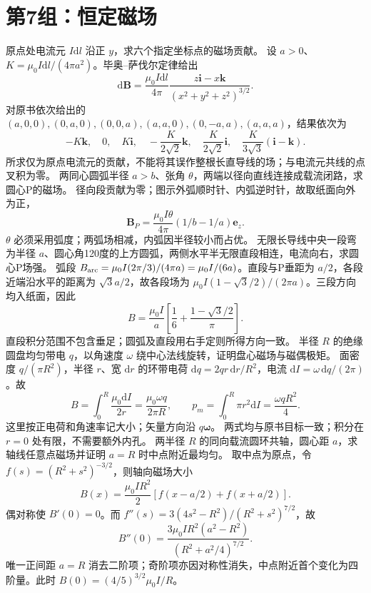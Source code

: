 \section{第7组：恒定磁场}
\problemtext 原点处电流元 $I\mathrm dl$ 沿正 $y$，求六个指定坐标点的磁场贡献。
\workings 设 $a>0$、$K=\mu_0 I\mathrm dl/(4\pi a^2)$。毕奥--萨伐尔定律给出
\[
\mathrm d\bm B=\frac{\mu_0 I\mathrm dl}{4\pi}\frac{z\bm i-x\bm k}{(x^2+y^2+z^2)^{3/2}}.
\]
对原书依次给出的 $(a,0,0),(0,a,0),(0,0,a),(a,a,0),(0,-a,a),(a,a,a)$，结果依次为
\[
-K\bm k,\quad 0,\quad K\bm i,\quad
-\frac{K}{2\sqrt2}\bm k,\quad
\frac{K}{2\sqrt2}\bm i,\quad
\frac{K}{3\sqrt3}(\bm i-\bm k).
\]
\crosscheck 所求仅为原点电流元的贡献，不能将其误作整根长直导线的场；与电流元共线的点叉积为零。
\problemtext 两同心圆弧半径 $a>b$、张角 $\theta$，两端以径向直线连接成载流闭路，求圆心P的磁场。
\workings 径向段贡献为零；图示外弧顺时针、内弧逆时针，故取纸面向外为正，
\[
\bm B_P=\frac{\mu_0I\theta}{4\pi}(1/b-1/a)\bm e_z.
\]
\crosscheck $\theta$ 必须采用弧度；两弧场相减，内弧因半径较小而占优。
\problemtext 无限长导线中央一段弯为半径 $a$、圆心角120度的上方圆弧，两侧水平半无限直段相连，电流向右，求圆心P场强。
\workings 弧段 $B_{\rm arc}=\mu_0 I(2\pi/3)/(4\pi a)=\mu_0 I/(6a)$。直段与P垂距为 $a/2$，各段近端沿水平的距离为 $\sqrt3a/2$，故各段场为 $\mu_0 I(1-\sqrt3/2)/(2\pi a)$。三段方向均入纸面，因此
\[
B=\frac{\mu_0 I}{a}\left[\frac16+\frac{1-\sqrt3/2}{\pi}\right].
\]
\crosscheck 直段积分范围不包含垂足；圆弧及直段用右手定则所得方向一致。
\problemtext 半径 $R$ 的绝缘圆盘均匀带电 $q$，以角速度 $\omega$ 绕中心法线旋转，证明盘心磁场与磁偶极矩。
\workings 面密度 $q/(\pi R^2)$，半径 $r$、宽 $\mathrm dr$ 的环带电荷 $\mathrm dq=2qr\,\mathrm dr/R^2$，电流 $\mathrm dI=\omega\,\mathrm dq/(2\pi)$。故
\[
B=\int_0^R \frac{\mu_0\mathrm dI}{2r}=\frac{\mu_0\omega q}{2\pi R},\qquad
p_m=\int_0^R\pi r^2\mathrm dI=\frac{\omega qR^2}{4}.
\]
这里按正电荷和角速率记大小；矢量方向沿 $q\bm\omega$。
\crosscheck 两式均与原书目标一致；积分在 $r=0$ 处有限，不需要额外内孔。
\problemtext 两半径 $R$ 的同向载流圆环共轴，圆心距 $a$，求轴线任意点磁场并证明 $a=R$ 时中点附近最均匀。
\workings 取中点为原点，令 $f(s)=(R^2+s^2)^{-3/2}$，则轴向磁场大小
\[
B(x)=\frac{\mu_0IR^2}{2}[f(x-a/2)+f(x+a/2)].
\]
偶对称使 $B'(0)=0$。而 $f''(s)=3(4s^2-R^2)/(R^2+s^2)^{7/2}$，故
\[
B''(0)=\frac{3\mu_0IR^2(a^2-R^2)}{(R^2+a^2/4)^{7/2}}.
\]
唯一正间距 $a=R$ 消去二阶项；奇阶项亦因对称性消失，中点附近首个变化为四阶量。此时 $B(0)=(4/5)^{3/2}\mu_0I/R$。
